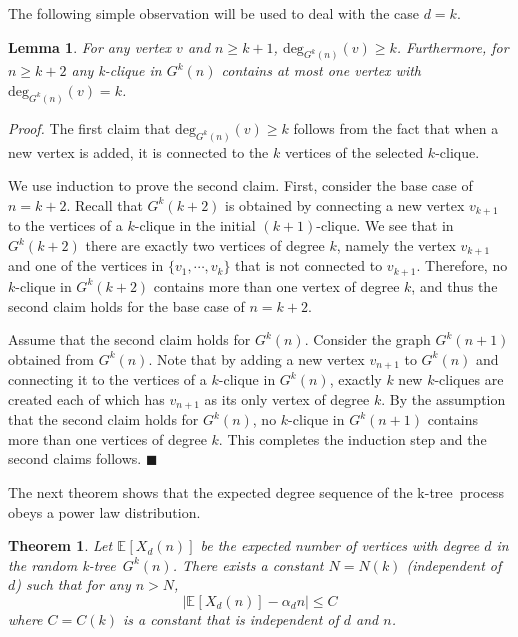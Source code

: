 \documentclass[11pt]{article}
\newtheorem{theorem}{Theorem}[section]
\newtheorem{lemma}{Lemma}[section]
\providecommand{\expectation}[2]{\mathbb{E}_{#2}\left[#1\right]}
\newenvironment{proof}[0]{\textit{Proof.} }{\hfill  $\blacksquare$ }
\providecommand{\degree}[2]{{\textrm{deg}_{#1}(#2)}}
\providecommand{\rktree}[2]{G^{#1}(#2)}
\providecommand{\tdeg}[2]{X_{#1}(#2)}
\providecommand{\edeg}[2]{\expectation{\tdeg{#1}{#2}}{}}
\providecommand{\ktree}{k-tree}
\begin{document}
The following simple observation will be used to deal with the case $d = k$.
\begin{lemma}
\label{lem:base}
For any vertex $v$ and $n \geq k + 1$, $\degree{\rktree{k}{n}}{v} \geq k$. Furthermore, for $n \geq k + 2 $
any k-clique in $\rktree{k}{n}$ contains at most one vertex with $\degree{\rktree{k}{n}}{v} = k$.
\end{lemma}
\begin{proof}
The first claim that $\degree{\rktree{k}{n}}{v} \geq k$ follows from the fact that when a new vertex is added, 
it is connected to the $k$ vertices of the selected $k$-clique.  

We use induction to prove the second claim. First, consider the base case of $n = k + 2$. Recall that $\rktree{k}{k + 2}$ 
is obtained by connecting a new vertex $v_{k + 1}$ to the vertices of a $k$-clique 
in the initial $(k + 1)$-clique. We see that in $\rktree{k}{k + 2}$ there are exactly two vertices of degree $k$, namely
the vertex $v_{k+1}$ and one of the vertices in $\{v_1, \cdots, v_k\}$ that is not connected to $v_{k + 1}$.
Therefore, no $k$-clique in $\rktree{k}{k + 2}$ contains more than one vertex of degree $k$, and thus the second claim 
holds for the base case of $n = k + 2$. 

Assume that the second claim holds for $\rktree{k}{n}$. Consider the graph $\rktree{k}{n + 1}$ obtained from $\rktree{k}{n}$. 
Note that by adding a new vertex $v_{n + 1}$ to $\rktree{k}{n}$ and connecting it to the vertices of a $k$-clique in 
$\rktree{k}{n}$, exactly $k$ new $k$-cliques are created each of which has $v_{n+1}$ as its only vertex of degree $k$. By the assumption that the second claim holds for $\rktree{k}{n}$,  
no $k$-clique in $\rktree{k}{n + 1}$ contains more than one
vertices of degree $k$. This completes the induction step and the second claims follows.             
\end{proof}




The next theorem shows that the expected degree sequence of the \ktree\ process obeys a power law distribution.
\begin{theorem}
\label{theorem-average}
Let $\edeg{d}{n}$ be the expected number of vertices with degree $d$ in the random \ktree\ $\rktree{k}{n}$. There exists a
constant $N = N(k)$ (independent of $d$) such that for any $n > N$,
\begin{equation}
\label{eq-average-limit}
\left|\edeg{d}{n} - \alpha_dn\right| \leq C
\end{equation}
where $C = C(k)$ is a constant that is independent of $d$ and $n$.
\end{theorem}
\end{document}
